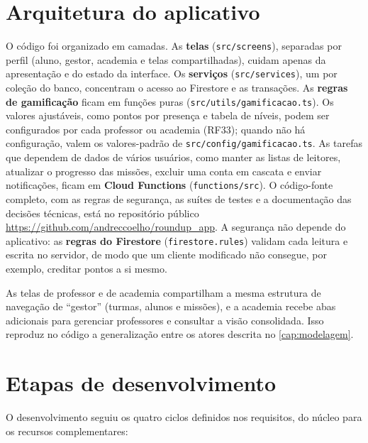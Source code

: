 \section{Arquitetura do aplicativo}

O código foi organizado em camadas. As \textbf{telas}
(\texttt{src/screens}), separadas por perfil (aluno, gestor, academia e
telas compartilhadas), cuidam apenas da apresentação e do estado da
interface. Os \textbf{serviços} (\texttt{src/services}), um por coleção do
banco, concentram o acesso ao Firestore e as transações. As
\textbf{regras de gamificação} ficam em funções puras
(\texttt{src/utils/gamificacao.ts}). Os valores ajustáveis, como pontos
por presença e tabela de níveis, podem ser configurados por cada professor
ou academia (RF33); quando não há configuração, valem os valores-padrão
de \texttt{src/config/gamificacao.ts}. As tarefas que dependem de dados de
vários usuários, como manter as listas de leitores, atualizar o progresso
das missões, excluir uma conta em cascata e enviar notificações, ficam em
\textbf{Cloud Functions} (\texttt{functions/src}). O código-fonte
completo, com as regras de segurança, as suítes de testes e a
documentação das decisões técnicas, está no repositório público
\url{https://github.com/andreccoelho/roundup_app}. A segurança não depende do
aplicativo: as \textbf{regras do Firestore} (\texttt{firestore.rules})
validam cada leitura e escrita no servidor, de modo que um cliente
modificado não consegue, por exemplo, creditar pontos a si mesmo.

As telas de professor e de academia compartilham a mesma estrutura de
navegação de ``gestor'' (turmas, alunos e missões), e a academia recebe
abas adicionais para gerenciar professores e consultar a visão
consolidada. Isso reproduz no código a generalização entre os atores
descrita no \autoref{cap:modelagem}.

\section{Etapas de desenvolvimento}

O desenvolvimento seguiu os quatro ciclos definidos nos requisitos, do
núcleo para os recursos complementares:

